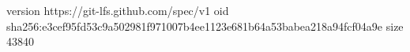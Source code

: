 version https://git-lfs.github.com/spec/v1
oid sha256:e3cef95fd53c9a502981f971007b4ee1123e681b64a53babea218a94fcf04a9e
size 43840
